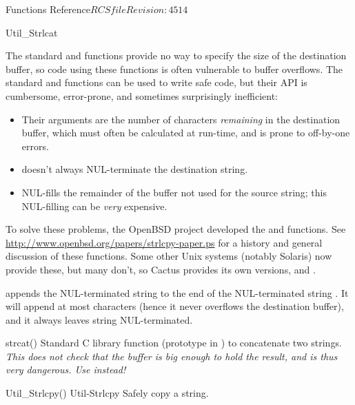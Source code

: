 \begin{cactuspart}{ Functions Reference}{$RCSfile$}{$Revision: 4514 $}
\begin{FunctionDescription}{Util\_Strlcat}
\begin{Discussion}
The standard  and  functions provide
no way to specify the size of the destination buffer, so code using
these functions is often vulnerable to buffer overflows.  The standard
 and  functions can be used to write
safe code, but their API is cumbersome, error-prone, and sometimes
surprisingly inefficient:
\begin{itemize}
\item	Their  arguments are the number of characters
	{\em remaining\/} in the destination buffer, which must
	often be calculated at run-time, and is prone to off-by-one
	errors.
\item	{} doesn't always NUL-terminate the destination string.
\item	{} NUL-fills the remainder of the buffer not
	used for the source string; this NUL-filling can be {\em very\/}
	expensive.
\end{itemize}

To solve these problems, the OpenBSD project developed the
 and  functions.  See
\url{http://www.openbsd.org/papers/strlcpy-paper.ps}
for a history and general discussion of these functions.
Some other Unix systems (notably Solaris) now provide these,
but many don't, so Cactus provides its own versions,
 and .

 appends the NUL-terminated string  to the
end of the NUL-terminated string .  It will append at most
 characters (hence it never overflows the
destination buffer), and it always leaves  string NUL-terminated.
\end{Discussion}

\begin{SeeAlsoSection}
\begin{SeeAlso}{strcat()}
Standard C library function (prototype in )
to concatenate two strings.
{\em This does not check that the buffer is big enough to hold the result,
and is thus very dangerous.  Use  instead!}
\end{SeeAlso}
\begin{SeeAlso2} {Util\_Strlcpy()} {Util-Strlcpy}
Safely copy a string.
\end{SeeAlso2}
\end{SeeAlsoSection}


\end{FunctionDescription}
\end{cactuspart}
